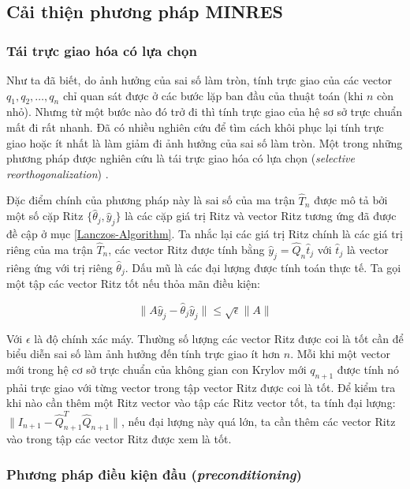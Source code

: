 \documentclass[14pt, a4paper]{article}
\numberwithin{equation}{section}
\numberwithin{algorithm}{section}
\numberwithin{figure}{section}
\numberwithin{dl}{section}
\numberwithin{md}{section}
\numberwithin{bd}{section}
\numberwithin{dn}{section}
\begin{document}
\subsection{Cải thiện phương pháp MINRES}

\subsubsection{Tái trực giao hóa có lựa chọn}

Như ta đã biết, do ảnh hưởng của sai số làm tròn, tính trực giao của các vector $q_1, q_2, \dots, q_n$ chỉ quan sát được ở các bước lặp ban đầu của thuật toán (khi $n$ còn nhỏ). Nhưng từ một bước nào đó trở đi thì tính trực giao của hệ sơ sở trực chuẩn mất đi rất nhanh.
Đã có nhiều nghiên cứu để tìm cách khôi phục lại tính trực giao hoặc ít nhất là làm giảm đi ảnh hưởng của sai số làm tròn.
Một trong những phương pháp được nghiên cứu là tái trực giao hóa có lựa chọn (\textit{selective reorthogonalization}) \cite{parlett1979lanczos}.

Đặc điểm chính của phương pháp này là sai số của ma trận $\hat{T}_n$ được mô tả bởi một số cặp Ritz $\lbrace \hat{\theta}_j, \hat{y}_j \rbrace$ là các cặp giá trị Ritz và vector Ritz tương ứng đã được đề cập ở mục \ref{Lanczos-Algorithm}. Ta nhắc lại các giá trị Ritz chính là các giá trị riêng của ma trận $\hat{T}_n$, các vector Ritz được tính bằng $\hat{y}_j =\hat{Q}_n \hat{t}_j$ với $\hat{t}_j$ là vector riêng ứng với trị riêng $\hat{\theta}_j$. Dấu mũ là các đại lượng được tính toán thực tế.
Ta gọi một tập các vector Ritz tốt nếu thỏa mãn điều kiện:

\begin{equation}
    \lVert A \hat{y}_j - \hat{\theta}_j \hat{y}_j \rVert \leq \sqrt{\epsilon} \lVert A \rVert
\end{equation}

Với $\epsilon$ là độ chính xác máy.
Thường số lượng các vector Ritz được coi là tốt cần để biểu diễn sai số làm ảnh hưởng đến tính trực giao ít hơn $n$. Mỗi khi một vector mới trong hệ cơ sở trực chuẩn của không gian con Krylov mới $q_{n+1}$ được tính nó phải trực giao với từng vector trong tập vector Ritz được coi là tốt. Để kiểm tra khi nào cần thêm một Ritz vector vào tập các Ritz vector tốt, ta tính đại lượng:
$\lVert I_{n+1} - \hat{Q}_{n+1}^T \hat{Q}_{n+1} \rVert$, nếu đại lượng này quá lớn, ta cần thêm các vector Ritz vào trong tập các vector Ritz được xem là tốt.

\subsubsection{Phương pháp điều kiện đầu (\textit{preconditioning})}
\end{document}
